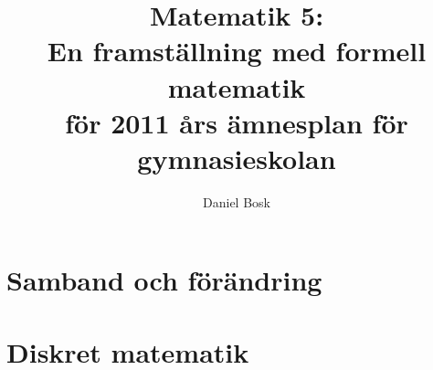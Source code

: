 \documentclass[a4paper,titlepage,reqno,final,twoside]{amsbook}
\theoremstyle{definition}
\theoremstyle{remark}
\numberwithin{section}{chapter}
\numberwithin{equation}{chapter}
\begin{document}

\title[Matematik 5]{
  Matematik 5:\\
  En framställning med formell matematik\\
  för 2011 års ämnesplan för gymnasieskolan
}
\author{Daniel Bosk}

\frontmatter



\mainmatter
\ifdraft{
  \doublespacing
}{}

\part{Samband och förändring}

\part{Diskret matematik}





\appendix
\ifdraft{
  \doublespacing
}{}
%

\backmatter
\ifdraft{
  \singlespacing
}{}


\clearpage
\end{document}
